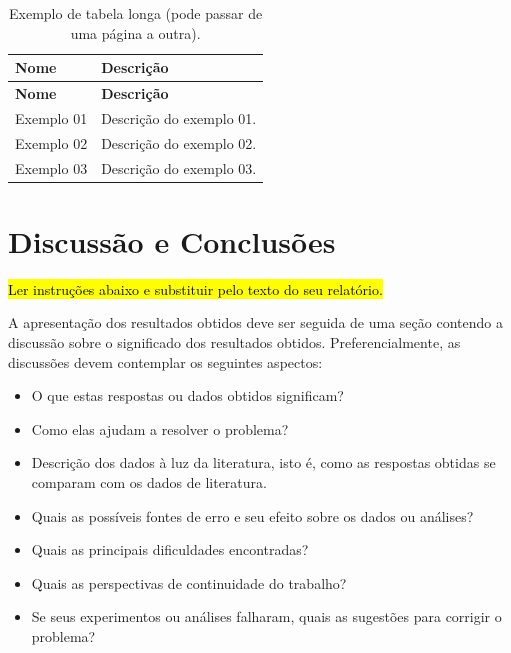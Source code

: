 \documentclass[10pt, a4paper]{article}
\begin{document}
\begin{longtable}{|p{3cm}|p{12cm}|}
	\caption{Exemplo de tabela longa (pode passar de uma página a outra).}
	\label{tbl-resultadosl-exemplo-longa} \\\hline 
	
	\rowcolor{lightgray}
	\textbf{Nome} & \textbf{Descrição} \\\hline		
	\endfirsthead
	\hline
	\rowcolor{lightgray}
	\textbf{Nome} & \textbf{Descrição} \\\hline		
	\endhead
	
	Exemplo 01 & Descrição do exemplo 01. \\\hline
	
	Exemplo 02 & Descrição do exemplo 02. \\\hline
	
	Exemplo 03 & Descrição do exemplo 03. \\\hline
\end{longtable}



\section{Discussão e Conclusões}
\label{sec-conclusoes}

\hl{Ler instruções abaixo e substituir pelo texto do seu relatório.}

A apresentação dos resultados obtidos deve ser seguida de uma seção contendo a discussão sobre o significado dos resultados obtidos. Preferencialmente, as discussões devem contemplar os seguintes aspectos: 

\begin{itemize}	
	\item O que estas respostas ou dados obtidos significam? 
	\item Como elas ajudam a resolver o problema? 
	\item Descrição dos dados à luz da literatura, isto é, como as respostas obtidas se comparam com os dados de literatura.
	\item Quais as possíveis fontes de erro e seu efeito sobre os dados ou análises?
	\item Quais as principais dificuldades encontradas? 
	\item Quais as perspectivas de continuidade do trabalho?
	\item Se seus experimentos ou análises falharam, quais as sugestões para corrigir o problema?	
\end{itemize}
\end{document}
